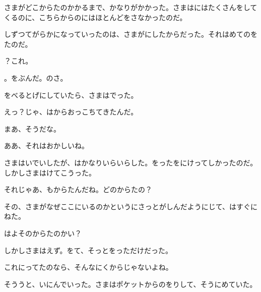 さまがどこからたのかかるまで、かなりがかかった。さまはにはたくさんをしてくるのに、こちらからのにはほとんどをさなかったのだ。

しずつてがらかになっていったのは、さまがにしたからだった。それはめてのをたのだ。

？これ。

。をぶんだ。のさ。

をべるとげにしていたら、さまはでった。

えっ？じゃ、はからおっこちてきたんだ。

まあ、そうだな。

ああ、それはおかしいね。

さまはいでいしたが、はかなりいらいらした。をったをにけってしかったのだ。しかしさまはけてこうった。

それじゃあ、もからたんだね。どのからたの？

その、さまがなぜここにいるのかというにさっとがしんだようにじて、はすぐにねた。

はよそのからたのかい？

しかしさまはえず。をて、そっとをっただけだった。

これにってたのなら、そんなにくからじゃないよね。

そううと、いにんでいった。さまはポケットからのをりして、そうにめていた。

